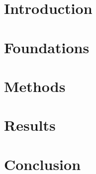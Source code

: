 \documentclass[11pt, abstract=on, openany]{scrreprt}
\newenvironment{acknowledgements}{%
  \renewcommand{\abstractname}{Acknowledgements}%
  \begin{abstract}
}{%
  \end{abstract}
}
\begin{document}

\clearpage
\pagestyle{empty} %

\clearpage

\begin{abstract}

\end{abstract}

\begin{acknowledgements}

\end{acknowledgements}

\pagestyle{plain} 
\tableofcontents
\clearpage

\printglossary[type=\acronymtype, title=List of Abbreviations]
\clearpage

\chapter{Introduction}
\label{chapter:introduction}

\chapter{Foundations}
\label{chapter:foundation}

\chapter{Methods}
\label{chapter:methods}

\chapter{Results}
\label{chapter:results}

\chapter{Conclusion}
\label{chapter:conclusion}


% 
% 


\printbibliography[heading=bibintoc, title={Bibliography}]


\appendix

\end{document}
